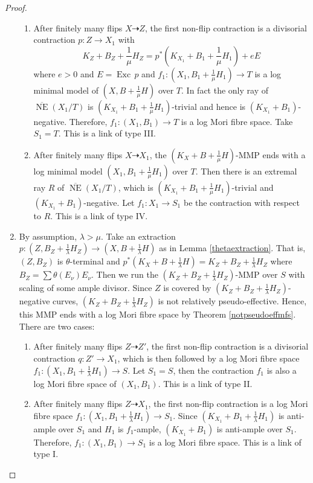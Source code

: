 \begin{proof}
\begin{enumerate}
\begin{enumerate}
      \item \label{a3}
            After finitely many flips $ X\dashrightarrow Z $, the first non-flip contraction is a divisorial contraction $ p:Z\to X_1$ with
            \[ K_Z+B_Z+\frac{1}{\mu}H_Z=p^*(K_{X_1}+B_1+\frac{1}{\mu}H_1)+eE \]
            where $ e>0 $ and  $E=\operatorname{Exc}\,p$ and  $f_{1}: (X_1,B_1+\frac{1}{\mu}H_1) \to T$ is a log minimal model of $(X,B+\frac{1}{\mu}H)$ over $T$. In fact the only ray of $ \overline{\operatorname{NE}}(X_1/T) $ is $ (K_{X_1}+B_1+\frac{1}{\mu}H_1) $-trivial and hence is $ (K_{X_1}+B_1) $-negative. Therefore, $ f_1:(X_1, B_1)\to T $ is a log Mori fibre space. Take $ S_1=T $. This is a link of type III.
      \item \label{a4}After finitely many flips $ X\dashrightarrow X_1 $, the $(K_{X}+B+\frac{1}{\mu}H)$-MMP ends with a log minimal model $ (X_1,B_1+\frac{1}{\mu}H_1) $ over $T $. Then there is an extremal ray $R$ of $ \overline{\operatorname{NE}}(X_1/T) $, which is $ (K_{X_1}+B_1+\frac{1}{\mu}H_1) $-trivial and $ (K_{X_1}+B_1) $-negative. Let $ f_1:X_1\to S_1 $ be the contraction with respect to $R$. This is a link of type IV.
    \end{enumerate}
    \item\label{b}By assumption, $\lambda>\mu$. Take  an extraction $ p:(Z,B_Z+\frac{1}{\lambda}H_Z)\to (X,B+\frac{1}{\lambda}H) $ as in Lemma \ref{thetaextraction}. That is,  $ (Z,B_Z) $ is $ \theta $-terminal and $ p^*(K_X+B+\frac{1}{\lambda}H)=K_Z+B_Z+\frac{1}{\lambda}H_Z $ where $ B_Z=\sum\theta(E_\nu)E_\nu $.
    Then we run the $ (K_Z+B_Z+\frac{1}{\lambda}H_Z) $-MMP over $ S $ with scaling of some ample divisor. Since $Z$ is covered by $ (K_Z+B_Z+\frac{1}{\lambda}H_Z) $-negative curves, $ (K_Z+B_Z+\frac{1}{\lambda}H_Z) $ is not relatively pseudo-effective. Hence, this MMP ends with a log Mori fibre space by Theorem \ref{notpseudoeffmfs}. There are two cases:
    \begin{enumerate}
      \item \label{b1}After finitely many flips $ Z\dashrightarrow Z' $, the first non-flip contraction is a divisorial contraction $ q:Z'\to X_1 $, which is then followed by a log Mori fibre space   $f_1:(X_1,B_1+\frac{1}{\lambda}H_1)\to S$. Let $ S_1=S $, then the contraction  $f_1$ is also a log Mori fibre space of $(X_1, B_1)$. This is a link of type II.
            \item\label{b2}After finitely many flips $ Z\dashrightarrow X_1 $, the first non-flip contraction is a log Mori fibre space  $f_1:(X_1,B_1+\frac{1}{\lambda}H_1)\to S_1$. Since $ (K_{X_1}+B_1+\frac{1}{\lambda}H_1) $ is anti-ample over $S_1$ and $ H_1 $ is $ f_1 $-ample, $(K_{X_1}+B_1) $ is anti-ample over $S_1$. Therefore, $ f_1:(X_1, B_1)\to S_1 $ is a log Mori fibre space. This is a link of type I.
    \end{enumerate}
  \end{enumerate}
\end{proof}
